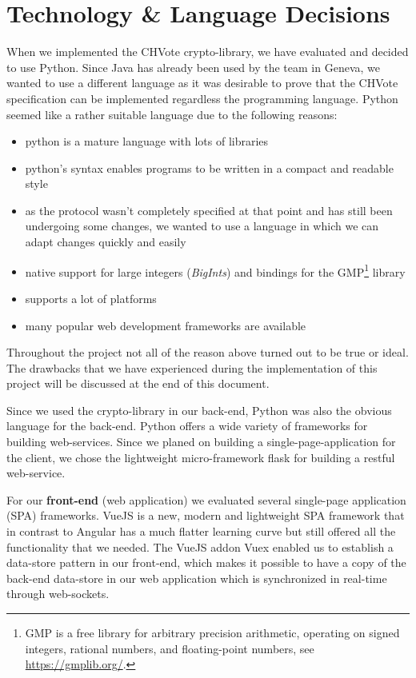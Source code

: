 \section{Technology \& Language Decisions}
When we implemented the CHVote crypto-library, we have evaluated and decided to use Python. Since Java has already been used by the team in Geneva, we wanted to use a different language as it was desirable to prove that the CHVote specification can be implemented regardless the programming language. Python seemed like a rather suitable language due to the following reasons:
\begin{itemize}	
	\item python is a mature language with lots of libraries
	\item python's syntax enables programs to be written in a compact and readable style
	\item as the protocol wasn't completely specified at that point and has still been undergoing some changes, we wanted to use a language in which we can adapt changes quickly and easily
	\item native support for large integers (\textit{BigInts}) and bindings for the GMP\footnote{GMP is a free library for arbitrary precision arithmetic, operating on signed integers, rational numbers, and floating-point numbers, see \url{https://gmplib.org/}.} library
	\item supports a lot of platforms
	\item many popular web development frameworks are available
\end{itemize}

Throughout the project not all of the reason above turned out to be true or ideal. The drawbacks that we have experienced during the implementation of this project will be discussed at the end of this document.

Since we used the crypto-library in our back-end, Python was also the obvious language for the back-end. Python offers a wide variety of frameworks for building web-services. Since we planed on building a single-page-application for the client, we chose the lightweight micro-framework flask for building a restful web-service. 

For our \textbf{front-end} (web application) we evaluated several single-page application (SPA) frameworks. VueJS is a new, modern and lightweight SPA framework that in contrast to Angular has a much flatter learning curve but still offered all the functionality that we needed. The VueJS addon Vuex enabled us to establish a data-store pattern in our front-end, which makes it possible to have a copy of the back-end data-store in our web application which is synchronized in real-time through web-sockets.


